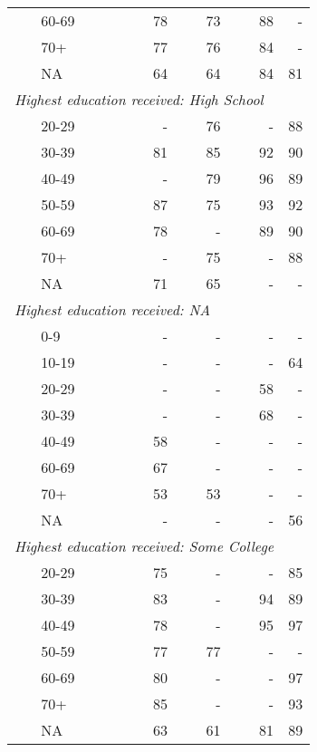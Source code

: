 \documentclass{article}
\begin{document}
\begin{longtable}{llrrrr}
 &  60-69 & 78 & 73 & 88 & - \\
 &  70+ & 77 & 76 & 84 & - \\
 & NA & 64 & 64 & 84 & 81 \\
\multicolumn{ 5 }{l}{\textit{ Highest education received: High School }}\\
&  20-29 & - & 76 & - & 88 \\
 &  30-39 & 81 & 85 & 92 & 90 \\
 &  40-49 & - & 79 & 96 & 89 \\
 &  50-59 & 87 & 75 & 93 & 92 \\
 &  60-69 & 78 & - & 89 & 90 \\
 &  70+ & - & 75 & - & 88 \\
 & NA & 71 & 65 & - & - \\
\multicolumn{ 5 }{l}{\textit{ Highest education received: NA }}\\
&  0-9 & - & - & - & - \\
 &  10-19 & - & - & - & 64 \\
 &  20-29 & - & - & 58 & - \\
 &  30-39 & - & - & 68 & - \\
 &  40-49 & 58 & - & - & - \\
 &  60-69 & 67 & - & - & - \\
 &  70+ & 53 & 53 & - & - \\
 & NA & - & - & - & 56 \\
\multicolumn{ 5 }{l}{\textit{ Highest education received: Some College }}\\
&  20-29 & 75 & - & - & 85 \\
 &  30-39 & 83 & - & 94 & 89 \\
 &  40-49 & 78 & - & 95 & 97 \\
 &  50-59 & 77 & 77 & - & - \\
 &  60-69 & 80 & - & - & 97 \\
 &  70+ & 85 & - & - & 93 \\
 & NA & 63 & 61 & 81 & 89 \\
\end{longtable}
\end{document}
